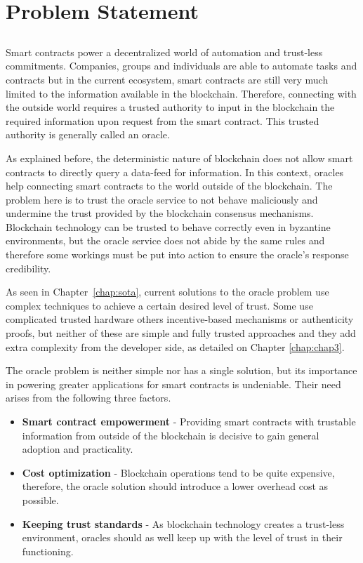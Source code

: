 \chapter{Problem Statement}\label{chap:chap4}

\section*{}

Smart contracts power a decentralized world of automation and trust-less commitments. Companies, groups and individuals are able to automate tasks and contracts but in the current ecosystem, smart contracts are still very much limited to the information available in the blockchain. Therefore, connecting with the outside world requires a trusted authority to input in the blockchain the required information upon request from the smart contract. This trusted authority is generally called an oracle.

As explained before, the deterministic nature of blockchain does not allow smart contracts to directly query a data-feed for information. In this context, oracles help connecting smart contracts to the world outside of the blockchain. The problem here is to trust the oracle service to not behave maliciously and undermine the trust provided by the blockchain consensus mechanisms. Blockchain technology can be trusted to behave correctly even in byzantine environments, but the oracle service does not abide by the same rules and therefore some workings must be put into action to ensure the oracle's response credibility.

As seen in Chapter~\ref{chap:sota}, current solutions to the oracle problem use complex techniques to achieve a certain desired level of trust. Some use complicated trusted hardware others incentive-based mechanisms or authenticity proofs, but neither of these are simple and fully trusted approaches and they add extra complexity from the developer side, as detailed on Chapter \ref{chap:chap3}.

The oracle problem is neither simple nor has a single solution, but its importance in powering greater applications for smart contracts  is undeniable. Their need arises from the following three factors.


\begin{itemize}
    \item \textbf{Smart contract empowerment} - Providing smart contracts with trustable information from outside of the blockchain is decisive to gain general adoption and practicality.
    \item \textbf{Cost optimization} - Blockchain operations tend to be quite expensive, therefore, the oracle solution should introduce a lower overhead cost as possible.
    \item \textbf{Keeping trust standards} - As blockchain technology creates a trust-less environment, oracles should as well keep up with the level of trust in their functioning.
\end{itemize}

